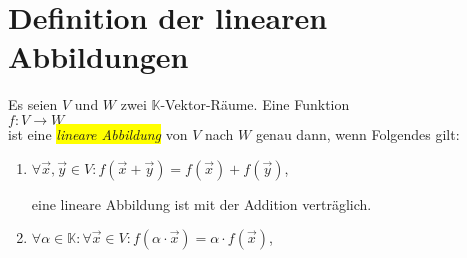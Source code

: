 \section{Definition der linearen Abbildungen}
\begin{Definition}[$\mathcal{L}(V, W)$]
Es seien $V$ und $W$ zwei $\mathbb{K}$-Vektor-R\"{a}ume.  Eine Funktion
\\[0.2cm]
\hspace*{1.3cm}
$f:V \rightarrow W$
\\[0.2cm]
ist eine \colorbox{yellow}{\emph{lineare Abbildung}} von $V$ nach $W$ genau dann, wenn Folgendes gilt:
\begin{enumerate}
\item $\forall \vec{x}, \vec{y} \in V: f(\vec{x} + \vec{y}) = f(\vec{x}) + f(\vec{y})$,

      eine lineare Abbildung ist mit der Addition vertr\"{a}glich.
\item $\forall \alpha \in \mathbb{K}: \forall \vec{x} \in V: f(\alpha \cdot \vec{x}) = \alpha \cdot f(\vec{x})$,


\end{enumerate}
\end{Definition}
